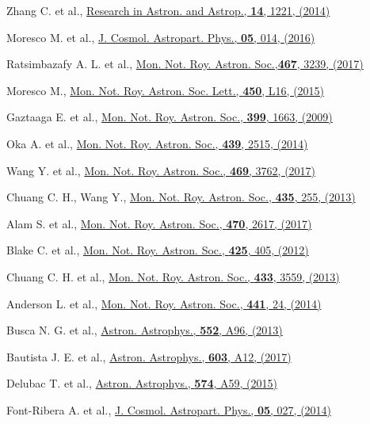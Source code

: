 \begin{thebibliography}{99}
 Zhang C. et al., \href{https://doi.org/10.1088/1674-4527/14/10/002}%
{Research in Astron. and Astrop., \textbf{14}, 1221, (2014)}

 Moresco M. et al., \href{https://doi.org/10.1088/1475-7516/2016/05/014}{J. Cosmol. Astropart. Phys., \textbf{05}, 014, (2016)}

  Ratsimbazafy A. L. et al., \href{https://doi.org/10.1093/mnras/stx301}{Mon. Not. Roy. Astron. Soc.,\textbf{467}, 3239, (2017)}

 Moresco M., \href{https://doi.org/10.1093/mnrasl/slv037}{Mon. Not. Roy. Astron. Soc. Lett., \textbf{450}, L16, (2015)}

 Gaztaaga E. et al., \href{https://doi.org/10.1111/j.1365-2966.2009.15405.x}
{Mon. Not. Roy. Astron. Soc., \textbf{399}, 1663, (2009)}

  Oka A. et al., \href{https://doi.org/10.1093/mnras/stu111}{Mon. Not. Roy. Astron. Soc., \textbf{439}, 2515, (2014)}

  Wang Y. et al., \href{https://doi.org/10.1093/mnras/stx1090}{Mon. Not. Roy. Astron. Soc., \textbf{469}, 3762, (2017)}

 Chuang C. H., Wang Y., \href{https://doi.org/10.1093/mnras/stt1290}%
{Mon. Not. Roy. Astron. Soc., \textbf{435}, 255, (2013)}

 Alam S. et al., \href{https://doi.org/10.1093/mnras/stx721}{Mon. Not. Roy. Astron. Soc., \textbf{470}, 2617, (2017)}

 Blake C.  et al., \href{https://doi.org/10.1111/j.1365-2966.2012.21473.x}{Mon. Not. Roy. Astron. Soc., \textbf{425}, 405, (2012)}

 Chuang C. H. et al., \href{https://doi.org/10.1093/mnras/stt988}{Mon. Not. Roy. Astron. Soc., \textbf{433}, 3559, (2013)}

  Anderson L. et al., \href{https://doi.org/10.1093/mnras/stu523}{Mon. Not. Roy. Astron. Soc., \textbf{441}, 24, (2014)}

 Busca N. G. et al., \href{https://doi.org/10.1051/0004-6361/201220724}{Astron. Astrophys., \textbf{552}, A96, (2013)}

 Bautista J. E. et al., \href{https://doi.org/10.1051/0004-6361/201730533}{Astron. Astrophys., \textbf{603}, A12, (2017)}

 Delubac T. et al., \href{https://doi.org/10.1051/0004-6361/201423969}{Astron. Astrophys., \textbf{574}, A59, (2015)}

 Font-Ribera A. et al., \href{https://doi.org/10.1088/1475-7516/2014/05/027}{J. Cosmol. Astropart. Phys., \textbf{05}, 027, (2014)}



\end{thebibliography}

